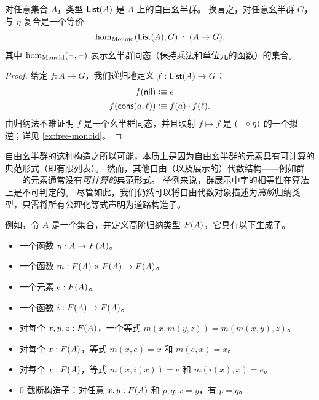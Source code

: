 \begin{lem}\label{thm:free-monoid}
  对任意集合 $A$，类型 $\mathsf{List}(A)$ 是 $A$ 上的自由幺半群。
  换言之，对任意幺半群 $G$，与 $\eta$ 复合是一个等价
  \[ \hom_{\mathrm{Monoid}}(\mathsf{List}(A),G) \simeq (A\to G), \]
  其中 $\hom_{\mathrm{Monoid}}(\mathord{\hspace{1pt}\text{--}\hspace{1pt}},\mathord{\hspace{1pt}\text{--}\hspace{1pt}})$ 表示幺半群同态（保持乘法和单位元的函数）的集合。
\end{lem}

\begin{proof}
  给定 $f:A\to G$，我们递归地定义 $\bar{f}:\mathsf{List}(A) \to G$：
  \begin{align*}
    \bar{f}(\mathsf{nil}) &\vcentcolon\equiv e\\
    \bar{f}(\mathsf{cons}(a,\ell)) &\vcentcolon\equiv f(a) \cdot \bar{f}(\ell).
  \end{align*}
  由归纳法不难证明 $\bar{f}$ 是一个幺半群同态，并且映射 $f\mapsto \bar f$ 是 $(\mathord{\hspace{1pt}\text{--}\hspace{1pt}}\circ \eta)$ 的一个拟逆；详见 \cref{ex:free-monoid}。
\end{proof}

%

自由幺半群的这种构造之所以可能，本质上是因为自由幺半群的元素具有可计算的典范形式（即有限列表）。
然而，其他自由（以及展示的）代数结构——例如群——的元素通常没有\emph{可计算的}典范形式。
举例来说，群展示中字的相等性在算法上是不可判定的。
尽管如此，我们仍然可以将自由代数对象描述为\emph{高阶}归纳类型，只需将所有公理化等式声明为道路构造子。

%
%
例如，令 $A$ 是一个集合，并定义高阶归纳类型 $F(A)$，它具有以下生成子。

\begin{itemize}
\item 一个函数 $\eta:A\to F(A)$。
\item 一个函数 $m: F(A) \times F(A) \to F(A)$。
\item 一个元素 $e:F(A)$。
\item 一个函数 $i:F(A) \to F(A)$。
\item 对每个 $x,y,z:F(A)$，一个等式 $m(x,m(y,z)) = m(m(x,y),z)$。
\item 对每个 $x:F(A)$，等式 $m(x,e) = x$ 和 $m(e,x) = x$。
\item 对每个 $x:F(A)$，等式 $m(x,i(x)) = e$ 和 $m(i(x),x) = e$。
\item $0$-截断构造子：对任意 $x,y:F(A)$ 和 $p,q:x=y$，有 $p=q$。
\end{itemize}

